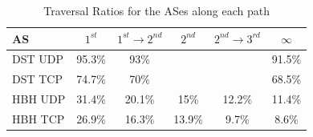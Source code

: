 \documentclass[conference]{IEEEtran}
\begin{document}
\begin{table}
\centering
\caption{Traversal Ratios for the ASes along each path}

\begin{tabular}{l|c|c|c|c|c}
   AS     & $1^{st}$  & $1^{st}\rightarrow 2^{nd}$   & $2^{nd}$  & $2^{nd} \rightarrow 3^{rd}$ &   $\infty$ \\ 
\hline \hline
DST UDP  & 95.3\%   & 93\%     &          &          & 91.5\%  \\
DST TCP  & 74.7\%   & 70\%     &          &          & 68.5\%  \\\hline
HBH UDP   & 31.4\%   & 20.1\%   & 15\%     & 12.2\%   & 11.4\%  \\ 
HBH TCP   & 26.9\%   & 16.3\%   & 13.9\%   & 9.7\%    & 8.6\%   \\ 
\end{tabular}
\label{tbl:uk_as1}

%
%
\end{table}





\end{document}
